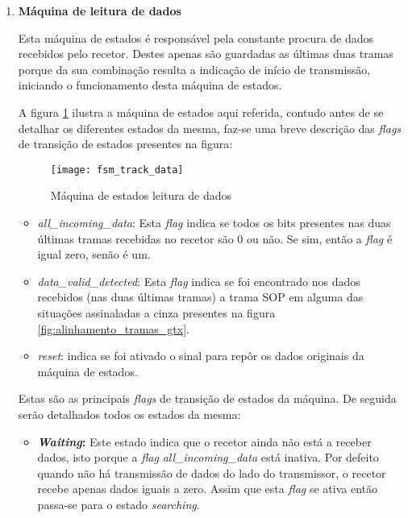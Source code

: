 \begin{enumerate}
	
	\item \textbf{Máquina de leitura de dados}
	 
	 Esta máquina de estados é responsável pela constante procura de dados recebidos pelo recetor. Destes apenas são guardadas as últimas duas tramas porque da sua combinação resulta a indicação de início de transmissão, iniciando o funcionamento desta máquina de estados.
	 
	 A figura \ref{fig:fsm2} ilustra a máquina de estados aqui referida, contudo antes de se detalhar os diferentes estados da mesma, faz-se uma breve descrição das \textit{flags} de transição de estados presentes na figura:

	 	\begin{figure}[h!]
	 		\begin{center}
	 			\leavevmode
	 			\texttt{[image: fsm\_track\_data]}
	 			\captionsetup{width=1.0\linewidth}
	 			\caption[Máquina de estados leitura de dados]{Máquina de estados leitura de dados}
	 			\label{fig:fsm2}
	 		\end{center}
		\end{figure}
	 
	\begin{itemize}
		\item \textit{all\_incoming\_data}: Esta \textit{flag} indica se todos os bits presentes nas duas últimas tramas recebidas no recetor são 0 ou não. Se sim, então a \textit{flag} é igual zero, senão é um.
		
		\item \textit{data\_valid\_detected}: Esta \textit{flag} indica se foi encontrado nos dados recebidos (nas duas últimas tramas) a trama SOP em alguma das situações assinaladas a cinza presentes na figura \ref{fig:alinhamento_tramas_gtx}.
		
		\item \textit{reset}: indica se foi ativado o sinal para repôr os dados originais da máquina de estados.
	\end{itemize}	 
	 
	 Estas são as principais \textit{flags} de transição de estados da máquina. De seguida serão detalhados todos os estados da mesma:
	 
	 	 \begin{itemize}
	 	\item \textbf{\textit{Waiting}:} Este estado indica que o recetor ainda não está a receber dados, isto porque a \textit{flag} \textit{all\_incoming\_data} está inativa. Por defeito quando não há transmissão de dados do lado do transmissor, o recetor recebe apenas dados iguais a zero. Assim que esta \textit{flag} se ativa então passa-se para o estado \textit{searching}.
	 	

\end{itemize}
\end{enumerate}
